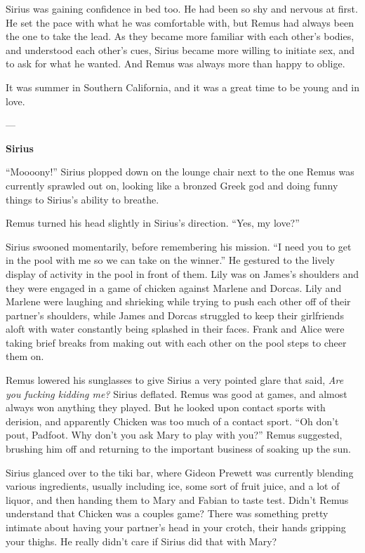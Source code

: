 \documentclass[12pt,twoside,openright]{memoir}
\begin{document}
Sirius was gaining confidence in bed too. He had been so shy and nervous at first. He set the pace with what he was comfortable with, but Remus had always been the one to take the lead. As they became more familiar with each other's bodies, and understood each other's cues, Sirius became more willing to initiate sex, and to ask for what he wanted. And Remus was always more than happy to oblige. 

It was summer in Southern California, and it was a great time to be young and in love.

---

\textbf{Sirius} 

``Moooony!'' Sirius plopped down on the lounge chair next to the one Remus was currently sprawled out on, looking like a bronzed Greek god and doing funny things to Sirius's ability to breathe.

Remus turned his head slightly in Sirius's direction. ``Yes, my love?''

Sirius swooned momentarily, before remembering his mission. ``I need you to get in the pool with me so we can take on the winner.'' He gestured to the lively display of activity in the pool in front of them. Lily was on James's shoulders and they were engaged in a game of chicken against Marlene and Dorcas. Lily and Marlene were laughing and shrieking while trying to push each other off of their partner's shoulders, while James and Dorcas struggled to keep their girlfriends aloft with water constantly being splashed in their faces. Frank and Alice were taking brief breaks from making out with each other on the pool steps to cheer them on.

Remus lowered his sunglasses to give Sirius a very pointed glare that said, \textit{Are you fucking kidding me?} Sirius deflated. Remus was good at games, and almost always won anything they played. But he looked upon contact sports with derision, and apparently Chicken was too much of a contact sport. ``Oh don't pout, Padfoot. Why don't you ask Mary to play with you?'' Remus suggested, brushing him off and returning to the important business of soaking up the sun.

Sirius glanced over to the tiki bar, where Gideon Prewett was currently blending various ingredients, usually including ice, some sort of fruit juice, and a lot of liquor, and then handing them to Mary and Fabian to taste test. Didn't Remus understand that Chicken was a couples game? There was something pretty intimate about having your partner's head in your crotch, their hands gripping your thighs. He really didn't care if Sirius did that with Mary?
\end{document}
